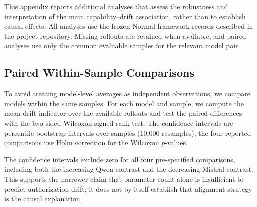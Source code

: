 This appendix reports additional analyses that assess the robustness and
interpretation of the main capability--drift association, rather than to
establish causal effects.
All analyses use the frozen Normal-framework records described in the project
repository.  Missing rollouts are retained when available, and paired analyses
use only the common evaluable samples for the relevant model pair.

\subsection{Paired Within-Sample Comparisons}
\label{app:additional-paired}

To avoid treating model-level averages as independent observations, we compare
models within the same samples.  For each model and sample, we compute the mean
drift indicator over the available rollouts and test the paired differences with
the two-sided Wilcoxon signed-rank test.  The confidence intervals are percentile
bootstrap intervals over samples (10{,}000 resamples); the four reported
comparisons use Holm correction for the Wilcoxon $p$-values.

\begin{table}[t]
\centering
\small
\setlength{\tabcolsep}{3pt}
%
\caption{Paired comparisons of per-sample mean drift. $\Delta$DR is model A
minus model B; $r_{\rm rb}$ is the rank-biserial effect size. The analysis
supports heterogeneous within-family directions, but does not identify the
causal source of those differences.}
\label{tab:additional-paired}
\end{table}

The confidence intervals exclude zero for all four pre-specified comparisons,
including both the increasing Qwen contrast and the decreasing Mistral contrast.
This supports the narrower claim that parameter count alone is insufficient to
predict authorization drift; it does not by itself establish that alignment
strategy is the causal explanation.

